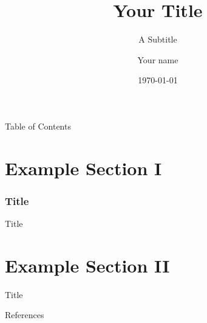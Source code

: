 \documentclass[aspectratio=169]{beamer} %
\title{Your Title}
\subtitle{A Subtitle}
\author{Your name}
\institute{Montana State University\\ Your Department}
\date{\today}
\begin{document}
\begin{frame}
	\titlepage{}
\end{frame}

\begin{frame}{Table of Contents}
	\tableofcontents
\end{frame}


\section{Example Section I}
\begin{frame}
	\frametitle{Title}

    \begin{itemize}
    \end{itemize}
\end{frame}
\begin{frame}{Title}
\end{frame}

\section{Example Section II}
\begin{frame}{Title}
\end{frame}

\begin{frame}[allowframebreaks]{References}
  \nocite{*}
  \printbibliography{}
\end{frame}
\end{document}
